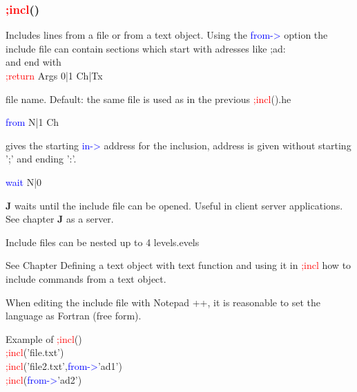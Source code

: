 \subsubsection{\textcolor{Red}{;incl}()}
\label{incl}
Includes lines from a file or from a text object. Using the \textcolor{blue}{from->}
option the include file can contain sections which start with adresses like
;ad: \\
and end with \\
\textcolor{Red}{;return}
\vspace{0.3cm}
\hline
\vspace{0.3cm}
\noindent Args  \tabto{3cm}  0|1  \tabto{5cm}   Ch|Tx  \tabto{7cm}
\begin{changemargin}{3cm}{0cm}
\noindent   file name. Default: the same file is used as in the previous \textcolor{Red}{;incl}().he
\end{changemargin}
\vspace{0.3cm}
\hline
\vspace{0.3cm}
\noindent \textcolor{blue}{from}  \tabto{3cm}  N|1  \tabto{5cm}   Ch  \tabto{7cm}
\begin{changemargin}{3cm}{0cm}
\noindent gives the starting \textcolor{blue}{in->} address for the inclusion, address is given without starting ';'
and ending ':'.
\end{changemargin}
\vspace{0.3cm}
\hline
\vspace{0.3cm}
\noindent \textcolor{blue}{wait} \tabto{3cm}  N|0  \tabto{5cm}    \tabto{7cm}
\begin{changemargin}{3cm}{0cm}
\noindent  \textbf{J} waits until the include file can be opened. Useful in client server applications.
See chapter \textbf{J} as a server.
\end {changemargin}
\hline
\vspace{0.2cm}
\begin{note}
Include files can be nested up to 4 levels.evels
\end{note}
\begin{note}
See Chapter Defining a text object with text function and using it in \textcolor{Red}{;incl} how to include
commands from a text object.
\end{note}
\begin{note}
When editing the include file with Notepad ++, it is reasonable to set the language as Fortran (free form).
\end{note}
\begin{example}[inpuincl]Example of \textcolor{Red}{;incl}()\\
\label{inpuincl}
\textcolor{Red}{;incl}('file.txt')\\
\textcolor{Red}{;incl}('file2.txt',\textcolor{blue}{from->}'ad1')\\
\textcolor{Red}{;incl}(\textcolor{blue}{from->}'ad2')
\end{example}
